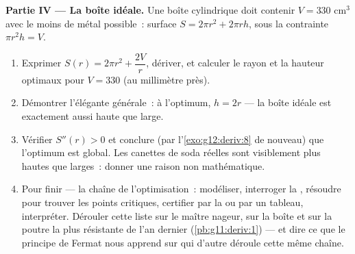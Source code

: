 \begin{problem}
\medskip
\noindent\textbf{Partie IV --- La boîte idéale.}
Une boîte cylindrique doit contenir $V = 330$ cm$^3$ avec le moins
de métal possible~: surface $S = 2\pi r^2 + 2\pi r h$, sous la
contrainte $\pi r^2 h = V$.
\begin{enumerate}[resume]
  \item Exprimer $S(r) = 2\pi r^2 + \dfrac{2V}{r}$, dériver, et
        calculer le rayon et la hauteur optimaux pour $V = 330$ (au
        millimètre près).
  \item Démontrer l'élégante  générale~: à l'optimum, $h = 2r$
        --- la boîte idéale est exactement aussi haute que large.
  \item Vérifier $S''(r) > 0$ et conclure (par
        l'\cref{exo:g12:deriv:8} de nouveau) que l'optimum est
        global. Les canettes de soda réelles sont visiblement plus
        hautes que larges~: donner une raison non mathématique.
  \item Pour finir --- la chaîne de l'optimisation~: modéliser,
        interroger la , résoudre pour trouver les points
        critiques, certifier par la  ou par un tableau,
        interpréter. Dérouler cette liste sur le maître nageur, sur
        la boîte et sur la poutre la plus résistante de l'an dernier
        (\cref{pb:g11:deriv:1}) --- et dire ce que le principe de
        Fermat nous apprend sur qui d'autre déroule cette même
        chaîne.
\end{enumerate}
\end{problem}
